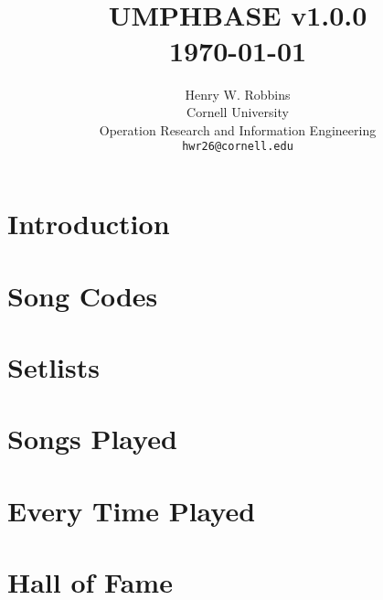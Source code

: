 \documentclass[8pt]{book}
\title{	\normalsize \textsc{} 					%
        \\[2.0cm]
        \HRule{2pt} \\ [0.5cm]
	\Huge \textbf{\uppercase{UMPHBASE} v1.0.0}	%
	\HRule{2pt} \\ [0.5cm]
	\large \today						%
}
\author{
	Henry W. Robbins\\
	Cornell University\\
	Operation Research and Information Engineering\\
        \texttt{hwr26@cornell.edu} \\
}
\makeatletter
\def\printtitle{%
    {\centering \@title\par}}
\def\printauthor{
    {\centering \large \@author}}
\makeatother
\begin{document}
\thispagestyle{empty}
\printtitle
\vfill
\printauthor
\newpage

\tableofcontents
\newpage

\chapter{Introduction}


\chapter{Song Codes}




\chapter{Setlists}




\chapter{Songs Played}


\newpage
\setlength{\tabcolsep}{3.5pt}



\chapter{Every Time Played}




\chapter{Hall of Fame}



\end{document}
